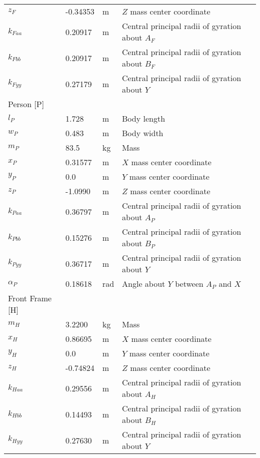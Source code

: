 \documentclass{bmd2019p}
\begin{document}
\begin{table}
\begin{tabular}{llll}
    $z_F$     & -0.34353 & \si{\meter} & $Z$ mass center coordinate \\
    $k_{Faa}$ &  0.20917 & \si{\meter} & Central principal radii of gyration about $A_F$ \\
    $k_{Fbb}$ &  0.20917 & \si{\meter} & Central principal radii of gyration about $B_F$ \\
    $k_{Fyy}$ &  0.27179 & \si{\meter} & Central principal radii of gyration about $Y$ \\
    Person [P] & & \\
    \midrule
    $l_P$      &  1.728   & \si{\meter} & Body length \\
    $w_P$      &  0.483   & \si{\meter} & Body width \\
    $m_P$      &  83.5    & \si{\kilogram} & Mass \\
    $x_P$      &  0.31577 & \si{\meter} & $X$ mass center coordinate \\
    $y_P$      & 0.0      & \si{\meter} & $Y$ mass center coordinate \\
    $z_P$      & -1.0990  & \si{\meter} & $Z$ mass center coordinate \\
    $k_{Paa}$  &  0.36797 & \si{\meter} & Central principal radii of gyration about $A_P$ \\
    $k_{Pbb}$  &  0.15276 & \si{\meter} & Central principal radii of gyration about $B_P$ \\
    $k_{Pyy}$  &  0.36717 & \si{\meter} & Central principal radii of gyration about $Y$ \\
    $\alpha_P$ & 0.18618 & \si{\radian} & Angle about $Y$ between $A_P$ and $X$ \\
    Front Frame [H] & & \\
    \midrule
    $m_H$ & 3.2200 & \si{\kilogram}     & Mass \\
    $x_H$ & 0.86695 & \si{\meter}       & $X$ mass center coordinate \\
    $y_H$ & 0.0 & \si{\meter}           & $Y$ mass center coordinate \\
    $z_H$ & -0.74824 & \si{\meter}      & $Z$ mass center coordinate \\
    $k_{Haa}$ & 0.29556 & \si{\meter}   & Central principal radii of gyration about $A_H$ \\
    $k_{Hbb}$ & 0.14493 & \si{\meter}   & Central principal radii of gyration about $B_H$ \\
    $k_{Hyy}$ & 0.27630 & \si{\meter}   & Central principal radii of gyration about $Y$ \\

\end{tabular}
\end{table}
\end{document}
